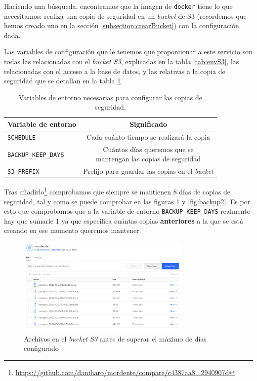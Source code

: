 Haciendo una búsqueda, encontramos que la imagen de \texttt{docker}  tiene lo que necesitamos: realiza una copia de seguridad en un \textit{bucket} de S3 (recordemos que hemos creado uno en la sección \ref{subsection:crearBucket}) con la configuración dada.

Las variables de configuración que le tenemos que proporcionar a este servicio son todas las relacionadas con el \textit{bucket S3}, explicadas en la tabla \ref{tab:envS3}, las relacionadas con el acceso a la base de datos, y las relativas a la copia de seguridad que se detallan en la tabla \ref{tab:envBackup}.

\begin{table}[]
    \centering
    \begin{tabular}{|l|c|}
        \hline
        \textbf{Variable de entorno} & \textbf{Significado} \\
        \hline
        \texttt{SCHEDULE} & Cada cuánto tiempo se realizará la copia \\
        \hline
        \texttt{BACKUP\_KEEP\_DAYS} & \makecell{Cuántos días queremos que se \\ mantengan las copias de seguridad} \\
        \hline
        \texttt{S3\_PREFIX} & Prefijo para guardar las copias en el \textit{bucket} \\
        \hline
    \end{tabular}
    \caption{Variables de entorno necesarias para configurar las copias de seguridad.}
    \label{tab:envBackup}
\end{table}

Tras añadirlo\footnote{\url{https://github.com/daniharo/mordente/compare/c4387aa8...2940907d}} comprobamos que siempre se mantienen 8 días de copias de seguridad, tal y como se puede comprobar en las figuras \ref{fig:backup1} y \ref{fig:backup2}. Es por esto que comprobamos que a la variable de entorno \texttt{BACKUP\_KEEP\_DAYS} realmente hay que sumarle 1 ya que especifica cuántas copias \textbf{anteriores} a la que se está creando en ese momento queremos mantener.

\begin{figure}[h]
\centering
\includegraphics[width=0.75\textwidth]{imagenes/implementacion/backup_antes_de_borrado_automatico.png}
\caption{Archivos en el \textit{bucket S3} antes de superar el máximo de días configurado}
\label{fig:backup1}
\end{figure}

